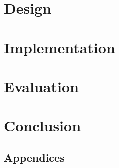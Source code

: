 \documentclass{l4proj}
\begin{document}
\chapter{Design}

\chapter{Implementation}


\chapter{Evaluation} 
\chapter{Conclusion}    

%
% 

\begin{appendices}

\chapter{Appendices}

\end{appendices}






\end{document}
